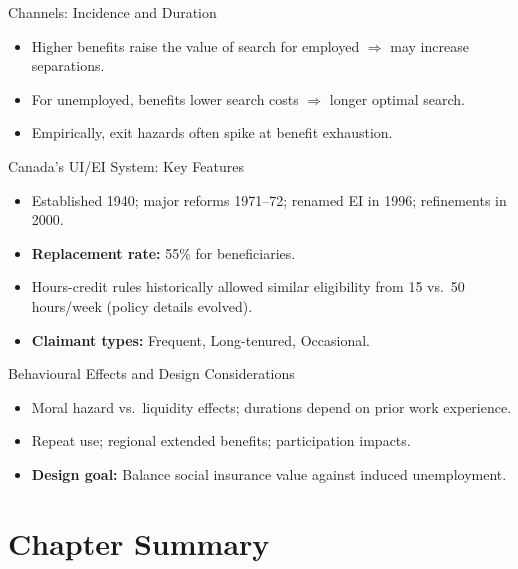 \documentclass[aspectratio=169]{beamer}
\begin{document}
\begin{frame}{Channels: Incidence and Duration}
\transfade
\begin{itemize}[<+->]
  \item Higher benefits raise the value of search for employed \(\Rightarrow\) may increase separations.
  \item For unemployed, benefits lower search costs \(\Rightarrow\) longer optimal search.
  \item Empirically, exit hazards often \alert{spike at benefit exhaustion}.
\end{itemize}
\end{frame}

\begin{frame}{Canada’s UI/EI System: Key Features}
\transfade
\begin{itemize}[<+->]
  \item Established 1940; major reforms 1971--72; renamed EI in 1996; refinements in 2000.
  \item \textbf{Replacement rate:} 55\% for beneficiaries.
  \item Hours-credit rules historically allowed similar eligibility from 15 vs.\ 50 hours/week (policy details evolved).
  \item \textbf{Claimant types:} Frequent, Long-tenured, Occasional.
\end{itemize}
\end{frame}

\begin{frame}{Behavioural Effects and Design Considerations}
\transfade
\begin{itemize}[<+->]
  \item Moral hazard vs.\ liquidity effects; durations depend on prior work experience.
  \item Repeat use; regional extended benefits; participation impacts.
  \item \textbf{Design goal:} Balance social insurance value against induced unemployment.
\end{itemize}
\end{frame}

\section{Chapter Summary}
\end{document}
